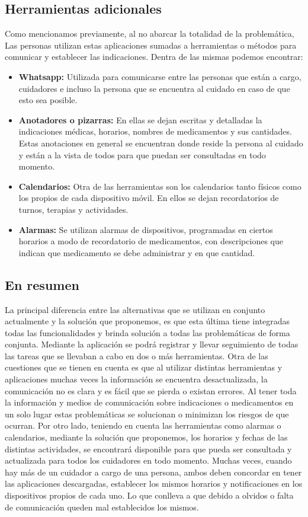 \documentclass[a4paper,12pt]{article}
\begin{document}
    \subsection{Herramientas adicionales}
    Como mencionamos previamente, al no abarcar la totalidad de la problemática, Las personas utilizan estas aplicaciones sumadas a herramientas o métodos para comunicar y establecer las indicaciones. Dentra de las mismas podemos encontrar:
    \begin{itemize}
        \item \textbf{Whatsapp:} Utilizada para comunicarse entre las personas que están a cargo, cuidadores e incluso la persona que se encuentra al cuidado en caso de que esto sea posible.
        \item \textbf{Anotadores o pizarras:} En ellas se dejan escritas y detalladas la indicaciones médicas, horarios, nombres de medicamentos y sus cantidades. Estas anotaciones en general se encuentran donde reside la persona al cuidado y están a la vista de todos para que puedan ser consultadas en todo momento.
        \item \textbf{Calendarios:} Otra de las herramientas son los calendarios tanto físicos como los propios de cada dispositivo móvil. En ellos se dejan recordatorios de turnos, terapias y actividades.
        \item \textbf{Alarmas:} Se utilizan alarmas de dispositivos, programadas en ciertos horarios a modo de recordatorio de medicamentos, con descripciones que indican que medicamento se debe administrar y en que cantidad.
    \end{itemize}
    \subsection{En resumen}
    La principal diferencia entre las alternativas que se utilizan en conjunto actualmente y la solución que proponemos, es que esta última tiene integradas todas las funcionalidades y brinda solución a todas las problemáticas de forma conjunta. Mediante la aplicación se podrá registrar y llevar seguimiento de todas las tareas que se llevaban a cabo en dos o más herramientas. \newline
    Otra de las cuestiones que se tienen en cuenta es que al utilizar distintas herramientas y aplicaciones muchas veces la información se encuentra desactualizada, la comunicación no es clara y es fácil que se pierda o existan errores. Al tener toda la información y medios de comunicación sobre indicaciones o medicamentos en un solo lugar estas problemáticas se solucionan o minimizan los riesgos de que ocurran. \newline
    Por otro lado, teniendo en cuenta las herramientas como alarmas o calendarios, mediante la solución que proponemos, los horarios y fechas de las distintas actividades, se encontrará disponible para que pueda ser consultada y actualizada para todos los cuidadores en todo momento. Muchas veces, cuando hay más de un cuidador a cargo de una persona, ambos deben concordar en tener las aplicaciones descargadas, establecer los mismos horarios y notificaciones en los dispositivos propios de cada uno. Lo que conlleva a que debido a olvidos o falta de comunicación queden mal establecidos los mismos.
\end{document}
